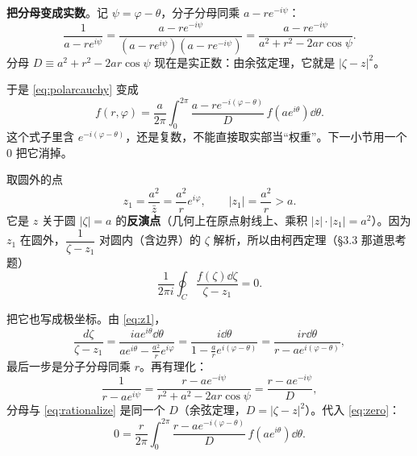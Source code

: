 \documentclass[11pt]{ctexart}
\let\origsubhdr\subhdr
\renewcommand{\subhdr}[1]{\par\needspace{4\baselineskip}\origsubhdr{#1}}
\begin{document}

\textbf{把分母变成实数}。记 $\psi=\varphi-\theta$，分子分母同乘 $a-re^{-i\psi}$：
\begin{equation}\label{eq:rationalize}
\frac{1}{a-re^{i\psi}}=\frac{a-re^{-i\psi}}{(a-re^{i\psi})(a-re^{-i\psi})}
=\frac{a-re^{-i\psi}}{a^{2}+r^{2}-2ar\cos\psi} .
\end{equation}
分母 $D\equiv a^{2}+r^{2}-2ar\cos\psi$ 现在是实正数：由余弦定理，它就是 $|\zeta-z|^{2}$。

于是 \eqref{eq:polarcauchy} 变成
\begin{equation}\label{eq:step1}
f(r,\varphi)=\frac{a}{2\pi}\int_0^{2\pi}\frac{a-re^{-i(\varphi-\theta)}}{D}\,f(ae^{i\theta})\dd\theta .
\end{equation}
这个式子里含 $e^{-i(\varphi-\theta)}$，还是复数，不能直接取实部当“权重”。下一小节用一个 $0$ 把它消掉。


取圆外的点
\begin{equation}\label{eq:z1}
z_1=\frac{a^{2}}{\bar z}=\frac{a^{2}}{r}e^{i\varphi},
\qquad |z_1|=\frac{a^{2}}{r}>a .
\end{equation}
它是 $z$ 关于圆 $|\zeta|=a$ 的\textbf{反演点}（几何上在原点射线上、乘积 $|z|\cdot|z_1|=a^{2}$）。因为 $z_1$ 在圆外，$\dfrac{1}{\zeta-z_1}$ 对圆内（含边界）的 $\zeta$ 解析，所以由柯西定理（§3.3 那道思考题）
\begin{equation}\label{eq:zero}
\frac{1}{2\pi i}\oint_C\frac{f(\zeta)\dd\zeta}{\zeta-z_1}=0 .
\end{equation}

把它也写成极坐标。由 \eqref{eq:z1}，
\[ \frac{d\zeta}{\zeta-z_1}=\frac{iae^{i\theta}\dd\theta}{ae^{i\theta}-\frac{a^{2}}{r}e^{i\varphi}}
=\frac{i\dd\theta}{1-\frac{a}{r}e^{i(\varphi-\theta)}}=\frac{ir\dd\theta}{r-ae^{i(\varphi-\theta)}} , \]
最后一步是分子分母同乘 $r$。再有理化：
\[ \frac{1}{r-ae^{i\psi}}=\frac{r-ae^{-i\psi}}{r^{2}+a^{2}-2ar\cos\psi}=\frac{r-ae^{-i\psi}}{D} , \]
分母与 \eqref{eq:rationalize} 是同一个 $D$（余弦定理，$D=|\zeta-z|^{2}$）。代入 \eqref{eq:zero}：
\begin{equation}\label{eq:step2}
0=\frac{r}{2\pi}\int_0^{2\pi}\frac{r-ae^{-i(\varphi-\theta)}}{D}\,f(ae^{i\theta})\dd\theta .
\end{equation}
\end{document}
